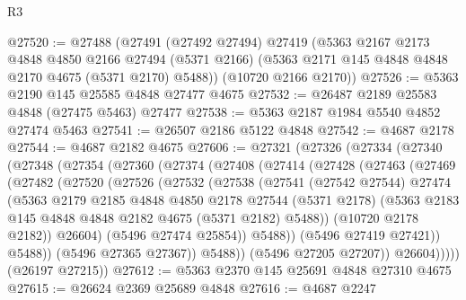 \begin{lexlean}{R3}
\begin{coremodule}
@27520 := @27488
    (@27491
      (@27492 @27494)
      @27419
      (@5363
        @2167
        @2173
        @4848
        @4850
        @2166
        @27494
        (@5371 @2166)
        (@5363 @2171 @145 @4848 @4848 @2170 @4675 (@5371 @2170) @5488))
      (@10720 @2166 @2170))
@27526 := @5363 @2190 @145 @25585 @4848 @27477 @4675
@27532 := @26487 @2189 @25583 @4848 (@27475 @5463) @27477
@27538 := @5363 @2187 @1984 @5540 @4852 @27474 @5463
@27541 := @26507 @2186 @5122 @4848
@27542 := @4687 @2178
@27544 := @4687 @2182 @4675
@27606 := @27321
    (@27326
      (@27334
        (@27340
          (@27348
            (@27354
              (@27360
                (@27374
                  (@27408
                    (@27414
                      (@27428
                        (@27463
                          (@27469
                            (@27482
                              (@27520
                                (@27526
                                  (@27532
                                    (@27538
                                      (@27541
                                        (@27542 @27544)
                                        @27474
                                        (@5363
                                          @2179
                                          @2185
                                          @4848
                                          @4850
                                          @2178
                                          @27544
                                          (@5371 @2178)
                                          (@5363
                                            @2183
                                            @145
                                            @4848
                                            @4848
                                            @2182
                                            @4675
                                            (@5371 @2182)
                                            @5488))
                                        (@10720 @2178 @2182))
                                      @26604)
                                    (@5496 @27474 @25854))
                                  @5488))
                              (@5496 @27419 @27421))
                            @5488))
                        (@5496 @27365 @27367))
                      @5488))
                  (@5496 @27205 @27207))
                @26604)))))
      (@26197 @27215))
@27612 := @5363 @2370 @145 @25691 @4848 @27310 @4675
@27615 := @26624 @2369 @25689 @4848
@27616 := @4687 @2247

\end{coremodule}
\end{lexlean}
